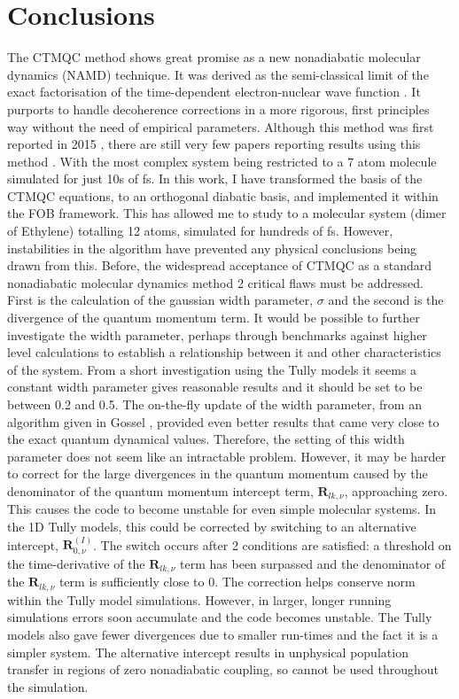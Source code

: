 \section{Conclusions}
The CTMQC method shows great promise as a new nonadiabatic molecular dynamics (NAMD) technique. It was derived as the semi-classical limit of the exact factorisation of the time-dependent electron-nuclear wave function \cite{abedi_exact_2010, agostini_semiclassical_2015}. It purports to handle decoherence corrections in a more rigorous, first principles way without the need of empirical parameters. Although this method was first reported in 2015 \cite{agostini_semiclassical_2015}, there are still very few papers reporting results using this method \cite{min_ab_2017, gossel_coupled-trajectory_2018,agostini_semiclassical_2015}. With the most complex system being restricted to a 7 atom molecule simulated for just 10s of fs\cite{min_ab_2017}. In this work, I have transformed the basis of the CTMQC equations, to an orthogonal diabatic basis, and implemented it within the FOB framework. This has allowed me to study to a molecular system (dimer of Ethylene) totalling 12 atoms, simulated for hundreds of fs. However, instabilities in the algorithm have prevented any physical conclusions being drawn from this. Before, the widespread acceptance of CTMQC as a standard nonadiabatic molecular dynamics method 2 critical flaws must be addressed. First is the calculation of the gaussian width parameter, $\sigma$ and the second is the divergence of the quantum momentum term. It would be possible to further investigate the width parameter, perhaps through benchmarks against higher level calculations to establish a relationship between it and other characteristics of the system. From a short investigation using the Tully models it seems a constant width parameter gives reasonable results and it should be set to be between 0.2 and 0.5. The on-the-fly update of the width parameter, from an algorithm given in Gossel \cite{gossel_coupled-trajectory_2018}, provided even better results that came very close to the exact quantum dynamical values. Therefore, the setting of this width parameter does not seem like an intractable problem. However, it may be harder to correct for the large divergences in the quantum momentum caused by the denominator of the quantum momentum intercept term, $\mathbf{R}_{lk, \nu}$, approaching zero. This causes the code to become unstable for even simple molecular systems. In the 1D Tully models, this could be corrected by switching to an alternative intercept, $\mathbf{R}_{0, \nu}^{(I)}$. The switch occurs after 2 conditions are satisfied: a threshold on the time-derivative of the $\mathbf{R}_{lk, \nu}$ term has been surpassed and the denominator of the $\mathbf{R}_{lk, \nu}$ term is sufficiently close to 0. The correction helps conserve norm within the Tully model simulations. However, in larger, longer running simulations errors soon accumulate and the code becomes unstable. The Tully models also gave fewer divergences due to smaller run-times and the fact it is a simpler system. The alternative intercept results in unphysical population transfer in regions of zero nonadiabatic coupling, so cannot be used throughout the simulation.
